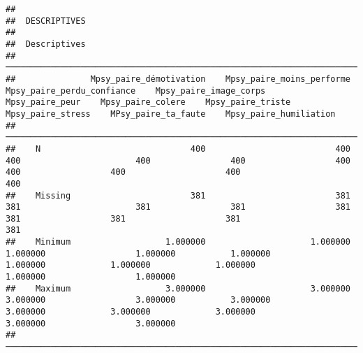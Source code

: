 \documentclass[
]{article}
\begin{document}
\begin{verbatim}
## 
##  DESCRIPTIVES
## 
##  Descriptives                                                                                                                                                                                                                                                   
##  ────────────────────────────────────────────────────────────────────────────────────────────────────────────────────────────────────────────────────────────────────────────────────────────────────────────────────────────────────────────────────────────── 
##               Mpsy_paire_démotivation    Mpsy_paire_moins_performe    Mpsy_paire_perdu_confiance    Mpsy_paire_image_corps    Mpsy_paire_peur    Mpsy_paire_colere    Mpsy_paire_triste    Mpsy_paire_stress    MPsy_paire_ta_faute    Mpsy_paire_humiliation   
##  ────────────────────────────────────────────────────────────────────────────────────────────────────────────────────────────────────────────────────────────────────────────────────────────────────────────────────────────────────────────────────────────── 
##    N                              400                          400                           400                       400                400                  400                  400                  400                    400                       400   
##    Missing                        381                          381                           381                       381                381                  381                  381                  381                    381                       381   
##    Minimum                   1.000000                     1.000000                      1.000000                  1.000000           1.000000             1.000000             1.000000             1.000000               1.000000                  1.000000   
##    Maximum                   3.000000                     3.000000                      3.000000                  3.000000           3.000000             3.000000             3.000000             3.000000               3.000000                  3.000000   
##  ──────────────────────────────────────────────────────────────────────────────────────────────────────────────────────────────────────────────────────────────────────────────────────────────────────────────────────────────────────────────────────────────
\end{verbatim}
\end{document}
